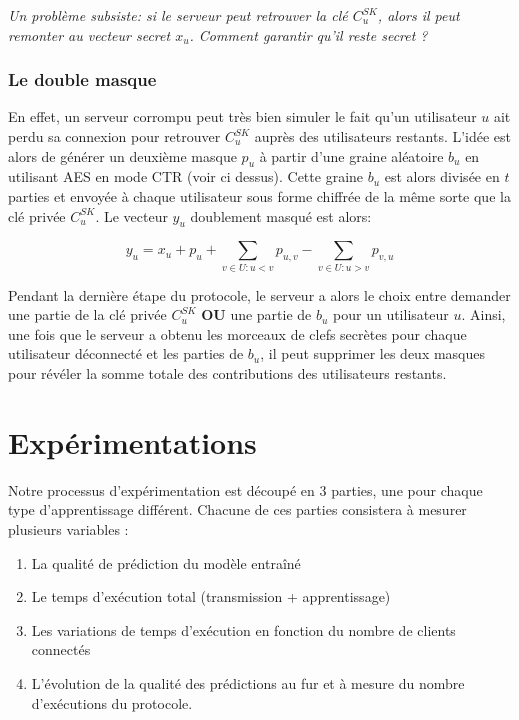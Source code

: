 \documentclass{article}
\begin{document}
\emph{Un problème subsiste: si le serveur peut retrouver la clé $C_u^{SK}$, alors il peut remonter au vecteur secret $x_u$. Comment garantir qu'il reste secret ?}

\subsubsection{Le double masque}

En effet, un serveur corrompu peut très bien simuler le fait qu'un utilisateur $u$ ait perdu sa connexion pour retrouver $C_u^{SK}$ auprès des utilisateurs restants. L'idée est alors de générer un deuxième masque $p_u$ à partir d'une graine aléatoire $b_u$ en utilisant AES en mode CTR (voir ci dessus). Cette graine $b_u$ est alors divisée en $t$ parties et envoyée à chaque utilisateur sous forme chiffrée de la même sorte que la clé privée $C_u^{SK}$. Le vecteur $y_u$ doublement masqué est alors:

\[
   y_u = x_u + p_u + \sum_{v\in U:u<v}p_{u,v} - \sum_{v\in U:u>v}p_{v,u}
\]

Pendant la dernière étape du protocole, le serveur a alors le choix entre demander une partie de la clé privée $C_u^{SK}$ \textbf{OU} une partie de $b_{u}$ pour un utilisateur $u$. Ainsi, une fois que le serveur a obtenu les morceaux de clefs secrètes pour chaque utilisateur déconnecté et les parties de $b_{u}$, il peut supprimer les deux masques pour révéler la somme totale des contributions des utilisateurs restants.

\section{Expérimentations}
    
    Notre processus d'expérimentation est découpé en 3 parties, une pour chaque type d'apprentissage différent.
    Chacune de ces parties consistera à mesurer plusieurs variables : \begin{enumerate}
        \item La qualité de prédiction du modèle entraîné
        \item Le temps d'exécution total (transmission + apprentissage)
        \item Les variations de temps d'exécution en fonction du nombre de clients connectés
        \item L'évolution de la qualité des prédictions au fur et à mesure du nombre d'exécutions du protocole.
    \end{enumerate}
    
\end{document}
